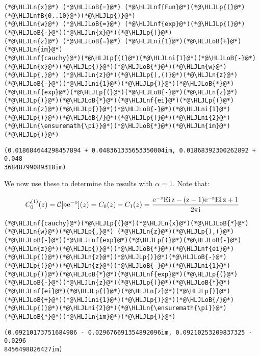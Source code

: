 \documentclass[12pt,landscape]{article}
\newcommand{\HLJLn}[1]{#1}
\newcommand{\HLJLnf}[1]{\textcolor[RGB]{66,102,213}{#1}}
\newcommand{\HLJLnfB}[1]{\textcolor[RGB]{59,151,46}{#1}}
\newcommand{\HLJLni}[1]{\textcolor[RGB]{59,151,46}{#1}}
\newcommand{\HLJLoB}[1]{\textcolor[RGB]{102,102,102}{\textbf{#1}}}
\newcommand{\HLJLp}[1]{#1}
\def\I{ {\rm i} }
\def\E{ {\rm e} }
\def\CC{ {\cal C} }
\def\Ei{ {\rm Ei}\, }
\def\Ei{\rm Ei\,}
\begin{document}
{\begin{lstlisting}
(*@\HLJLn{x}@*) (*@\HLJLoB{=}@*) (*@\HLJLnf{Fun}@*)(*@\HLJLp{(}@*)(*@\HLJLnfB{0..10}@*)(*@\HLJLp{)}@*)
(*@\HLJLn{w}@*) (*@\HLJLoB{=}@*) (*@\HLJLnf{exp}@*)(*@\HLJLp{(}@*)(*@\HLJLoB{-}@*)(*@\HLJLn{x}@*)(*@\HLJLp{)}@*)
(*@\HLJLn{z}@*) (*@\HLJLoB{=}@*) (*@\HLJLni{1}@*)(*@\HLJLoB{+}@*)(*@\HLJLn{im}@*)
(*@\HLJLnf{cauchy}@*)(*@\HLJLp{((}@*)(*@\HLJLni{1}@*)(*@\HLJLoB{-}@*)(*@\HLJLn{x}@*)(*@\HLJLp{)}@*)(*@\HLJLoB{*}@*)(*@\HLJLn{w}@*)(*@\HLJLp{,}@*) (*@\HLJLn{z}@*)(*@\HLJLp{),((}@*)(*@\HLJLn{z}@*)(*@\HLJLoB{-}@*)(*@\HLJLni{1}@*)(*@\HLJLp{)}@*)(*@\HLJLoB{*}@*)(*@\HLJLnf{exp}@*)(*@\HLJLp{(}@*)(*@\HLJLoB{-}@*)(*@\HLJLn{z}@*)(*@\HLJLp{)}@*)(*@\HLJLoB{*}@*)(*@\HLJLnf{ei}@*)(*@\HLJLp{(}@*)(*@\HLJLn{z}@*)(*@\HLJLp{)}@*)(*@\HLJLoB{-}@*)(*@\HLJLni{1}@*)(*@\HLJLp{)}@*)(*@\HLJLoB{/}@*)(*@\HLJLp{(}@*)(*@\HLJLni{2}@*)(*@\HLJLn{\ensuremath{\pi}}@*)(*@\HLJLoB{*}@*)(*@\HLJLn{im}@*)(*@\HLJLp{)}@*)
\end{lstlisting}

\begin{lstlisting}
(0.018684644298457894 + 0.048361335653350004im, 0.01868392300262892 + 0.048
36848799089318im)
\end{lstlisting}


We now use these to determine the results with $\alpha = 1$. Note that:

\[
C_0^{(1)}(z) = \CC[\diamond \E^{-\diamond}](z) =C_0(z) - C_1(z) = { \E^{-z} \Ei z - (z-1) \E^{-z} \Ei z +1 \over 2 \pi \I}
\]

\begin{lstlisting}
(*@\HLJLnf{cauchy}@*)(*@\HLJLp{(}@*)(*@\HLJLn{x}@*)(*@\HLJLoB{*}@*)(*@\HLJLn{w}@*)(*@\HLJLp{,}@*) (*@\HLJLn{z}@*)(*@\HLJLp{),(}@*)(*@\HLJLoB{-}@*)(*@\HLJLnf{exp}@*)(*@\HLJLp{(}@*)(*@\HLJLoB{-}@*)(*@\HLJLn{z}@*)(*@\HLJLp{)}@*)(*@\HLJLoB{*}@*)(*@\HLJLnf{ei}@*)(*@\HLJLp{(}@*)(*@\HLJLn{z}@*)(*@\HLJLp{)}@*)(*@\HLJLoB{-}@*)(*@\HLJLp{(}@*)(*@\HLJLn{z}@*)(*@\HLJLoB{-}@*)(*@\HLJLni{1}@*)(*@\HLJLp{)}@*)(*@\HLJLoB{*}@*)(*@\HLJLnf{exp}@*)(*@\HLJLp{(}@*)(*@\HLJLoB{-}@*)(*@\HLJLn{z}@*)(*@\HLJLp{)}@*)(*@\HLJLoB{*}@*)(*@\HLJLnf{ei}@*)(*@\HLJLp{(}@*)(*@\HLJLn{z}@*)(*@\HLJLp{)}@*)(*@\HLJLoB{+}@*)(*@\HLJLni{1}@*)(*@\HLJLp{)}@*)(*@\HLJLoB{/}@*)(*@\HLJLp{(}@*)(*@\HLJLni{2}@*)(*@\HLJLn{\ensuremath{\pi}}@*)(*@\HLJLoB{*}@*)(*@\HLJLn{im}@*)(*@\HLJLp{)}@*)
\end{lstlisting}

\begin{lstlisting}
(0.09210173751684986 - 0.029676691354892096im, 0.09210253209837325 - 0.0296
8456498826427im)
\end{lstlisting}


}
\end{document}
